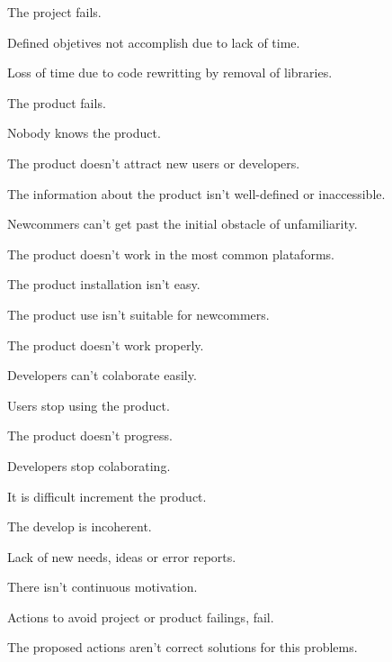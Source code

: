 \documentclass[twocolumn]{article}
\begin{document}
\begin{labelist}
\item The project fails.
  \begin{labelist}
    \item Defined objetives not accomplish due to lack of time.
    \item Loss of time due to code rewritting by removal of
      libraries.
  \end{labelist}
\item The product fails.
  \begin{labelist}
    \item Nobody knows the product.
    \item The product doesn't attract new users or developers.
      \begin{labelist}
        \item The information about the product isn't well-defined or
          inaccessible.
        \item Newcommers can't get past the initial obstacle of
          unfamiliarity.
        \item The product doesn't work in the most common plataforms.
        \item The product installation isn't easy.
        \item The product use isn't suitable for newcommers.
        \item The product doesn't work properly.
        \item Developers can't colaborate easily.
      \end{labelist}
    \item Users stop using the product.
      \begin{labelist}
        \item The product doesn't progress.
      \end{labelist}
    \item Developers stop colaborating.
      \begin{labelist}
        \item It is difficult increment the product.
        \item The develop is incoherent.
        \item Lack of new needs, ideas or error reports.
        \item There isn't continuous motivation.
      \end{labelist}
  \end{labelist}
\item Actions to avoid project or product failings, fail.
  \begin{labelist}
    \item The proposed actions aren't correct solutions for this
      problems.
  \end{labelist}
\end{labelist}
\end{document}
